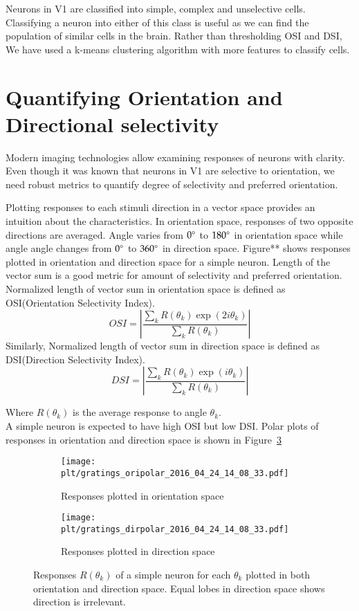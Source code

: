 \documentclass[MTech]{iitmdiss}
\newcommand{\plt}{thesis_plots}
\begin{document}
Neurons in V1 are classified into simple, complex and unselective cells. Classifying a neuron into either of this class is useful as we can find the population of similar cells in the brain. Rather than thresholding OSI and DSI, We have used a k-means clustering algorithm with more features to classify cells.
\section{Quantifying Orientation and Directional selectivity} %
\label{sec:quantifying_orientation_and_directional_selectivity}
Modern imaging technologies allow examining responses of neurons with clarity. Even though it was known that neurons in V1 are selective to orientation, we need robust metrics to quantify degree of selectivity and preferred orientation.

Plotting responses to each stimuli direction in a vector space provides an intuition about the characteristics. In orientation space, responses of two opposite directions are averaged. Angle varies from $0\degree$ to $180\degree$ in orientation space while angle angle changes from $0\degree$ to $360\degree$ in direction space. Figure** shows responses plotted in orientation and direction space for a simple neuron. Length of the vector sum is a good metric for amount of selectivity and preferred orientation. Normalized length of vector sum in orientation space is defined as OSI(Orientation Selectivity Index).
$$OSI = \left|\frac{\sum_{k} R(\theta_k) \exp(2i\theta_k)}{\sum_{k} R(\theta_k)}\right|$$
Similarly, Normalized length of vector sum in direction space is defined as DSI(Direction Selectivity Index).
$$DSI = \left|\frac{\sum_{k} R(\theta_k) \exp(i\theta_k)}{\sum_{k} R(\theta_k)}\right|$$

Where $R(\theta_k)$ is the average response to angle $\theta_k$.\\
A simple neuron is expected to have high OSI but low DSI. Polar plots of responses in orientation and direction space is shown in Figure~\ref{fig:oridir_simple}
\begin{figure}[h]
  \begin{subfigure}[b]{0.5\textwidth}
    \texttt{[image: \\plt/gratings\_oripolar\_2016\_04\_24\_14\_08\_33.pdf]}
    \caption{Responses plotted in orientation space}
    \label{fig:ori_simple}
  \end{subfigure}%
  \begin{subfigure}[b]{0.5\textwidth}
    \texttt{[image: \\plt/gratings\_dirpolar\_2016\_04\_24\_14\_08\_33.pdf]}
    \caption{Responses plotted in direction space}
    \label{fig:dir_simple}
  \end{subfigure}%
  \caption{Responses $R(\theta_k)$ of a simple neuron for each $\theta_k$ plotted in both orientation and direction space. Equal lobes in direction space shows direction is irrelevant.}\label{fig:oridir_simple}
\end{figure}
\end{document}

